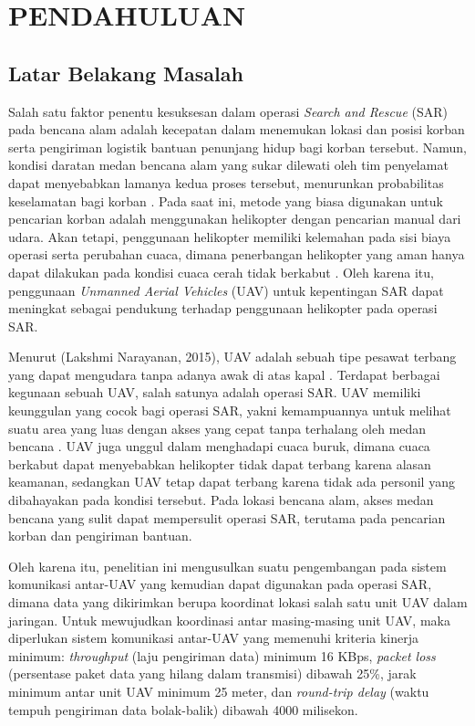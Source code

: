 \chapter{PENDAHULUAN}

\section{Latar Belakang Masalah}
Salah satu faktor penentu kesuksesan dalam operasi \textit{Search and Rescue} (SAR) pada bencana alam adalah kecepatan dalam menemukan lokasi dan posisi korban serta pengiriman logistik bantuan penunjang hidup bagi korban tersebut. Namun, kondisi daratan medan bencana alam yang sukar dilewati oleh tim penyelamat dapat menyebabkan lamanya kedua proses tersebut, menurunkan probabilitas keselamatan bagi korban \cite{syafitriAutonomousDisasterVictim2020}. Pada saat ini, metode yang biasa digunakan untuk pencarian korban adalah menggunakan helikopter dengan pencarian manual dari udara. Akan tetapi, penggunaan helikopter memiliki kelemahan pada sisi biaya operasi serta perubahan cuaca, dimana penerbangan helikopter yang aman hanya dapat dilakukan pada kondisi cuaca cerah tidak berkabut \cite{shimanskiRisksMountainRescue2008}. Oleh karena itu, penggunaan \textit{Unmanned Aerial Vehicles} (UAV) untuk kepentingan SAR dapat meningkat sebagai pendukung terhadap penggunaan helikopter pada operasi SAR.

Menurut (Lakshmi Narayanan, 2015), UAV adalah sebuah tipe pesawat terbang yang dapat mengudara tanpa adanya awak di atas kapal \cite{lakshminarayananJointNetworkDisaster2015}. Terdapat berbagai kegunaan sebuah UAV, salah satunya adalah operasi SAR. UAV memiliki keunggulan yang cocok bagi operasi SAR, yakni kemampuannya untuk melihat suatu area yang luas dengan akses yang cepat tanpa terhalang oleh medan bencana \cite{DronesSearchRescue}. UAV juga unggul dalam menghadapi cuaca buruk, dimana cuaca berkabut dapat menyebabkan helikopter tidak dapat terbang karena alasan keamanan, sedangkan UAV tetap dapat terbang karena tidak ada personil yang dibahayakan pada kondisi tersebut. Pada lokasi bencana alam, akses medan bencana yang sulit dapat mempersulit operasi SAR, terutama pada pencarian korban dan pengiriman bantuan. 

Oleh karena itu, penelitian ini mengusulkan suatu pengembangan pada sistem komunikasi antar-UAV yang kemudian dapat digunakan pada operasi SAR, dimana data yang dikirimkan berupa koordinat lokasi salah satu unit UAV dalam jaringan. Untuk mewujudkan koordinasi antar masing-masing unit UAV, maka diperlukan sistem komunikasi antar-UAV yang memenuhi kriteria kinerja minimum: \textit{throughput} (laju pengiriman data) minimum 16 KBps, \textit{packet loss} (persentase paket data yang hilang dalam transmisi) dibawah 25\%, jarak minimum antar unit UAV minimum 25 meter, dan \textit{round-trip delay} (waktu tempuh pengiriman data bolak-balik) dibawah 4000 milisekon.

